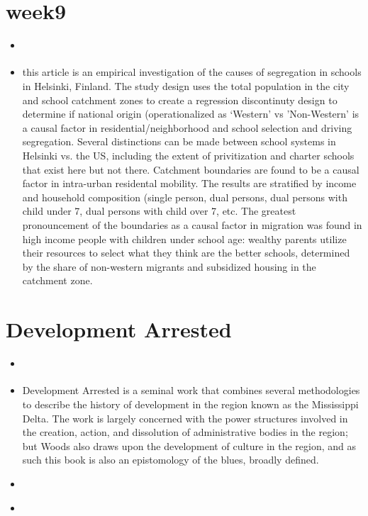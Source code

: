 \documentclass{article}
\begin{document}
\section{week9}
\begin{itemize}
\item \cite{kauppinen2022UnderstandingEffects}
\item this article is an empirical investigation of the causes of segregation in schools in Helsinki, Finland. The study design uses the total population in the city and school catchment zones to create a regression discontinuty design to determine if national origin (operationalized as `Western' vs 'Non-Western' is a causal factor in residential/neighborhood and school selection and driving segregation. Several distinctions can be made between school systems in Helsinki vs. the US, including the extent of privitization and charter schools that exist here but not there. Catchment boundaries are found to be a causal factor in intra-urban residental mobility. The results are stratified by income and household composition (single person, dual persons, dual persons with child under 7, dual persons with child over 7, etc. The greatest pronouncement of the boundaries as a causal factor in migration was found in high income people with children under school age: wealthy parents utilize their resources to select what they think are the better schools, determined by the share of non-western migrants and subsidized housing in the catchment zone.
  
  
\end{itemize}
\section{Development Arrested}
\begin{itemize}

\item \cite{woods2017DevelopmentArrested}
\item Development Arrested is a seminal work that combines several methodologies to describe the history of development in the region known as the Mississippi Delta. The work is largely concerned with the power structures involved in the creation, action, and dissolution of administrative bodies in the region; but Woods also draws upon the development of culture in the region, and as such this book is also an epistomology of the blues, broadly defined.

\item \cite{isenberg2004SymposiumWoods}

\item \cite{tiefenbacher2019DevelopmentArrested}
\end{itemize}



\end{document}
